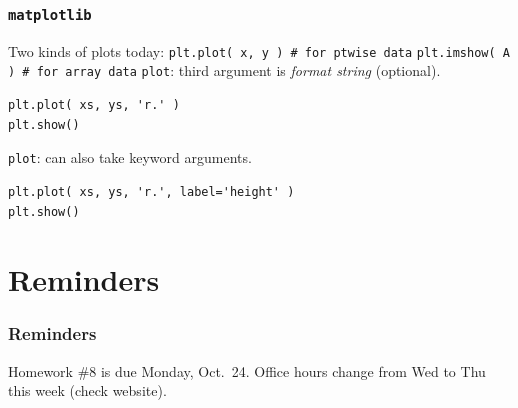 \documentclass[11pt]{beamer}
\begin{document}
\begin{frame}[fragile]
  \frametitle{\texttt{matplotlib}}
  \Enlarge

  \begin{enumerate}
    \myitem  Two kinds of plots today:
    \mysubitem  \texttt{plt.plot( x, y )  \# for ptwise data}
    \mysubitem  \texttt{plt.imshow( A )   \# for array data}
    \myitem  \texttt{plot}:  third argument is \emph{format string} (optional).
  \end{enumerate}
  \begin{Verbatim}
plt.plot( xs, ys, 'r.' )
plt.show()
  \end{Verbatim}
  \begin{enumerate}
    \myitem  \texttt{plot}:  can also take keyword arguments.
  \end{enumerate}
  \begin{Verbatim}
plt.plot( xs, ys, 'r.', label='height' )
plt.show()
  \end{Verbatim}
\end{frame}

\section{Reminders}

\begin{frame}
  \frametitle{Reminders}
  \Enlarge

  \begin{itemize}
  \myitem  Homework \#8 is due Monday, Oct.\ 24.
  \myitem  Office hours change from Wed to Thu this week (check website).
  \end{itemize}
\end{frame}
\end{document}
